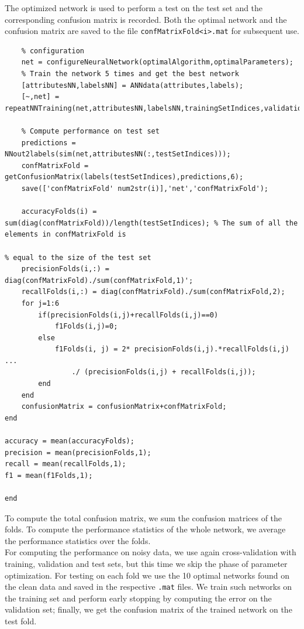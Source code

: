 \documentclass{article}
\begin{document}
The optimized network is used to perform a test on the test set and the corresponding confusion matrix is recorded. Both the optimal network and the confusion matrix are saved to the file \verb$confMatrixFold<i>.mat$ for subsequent use.
\begin{lstlisting}[firstnumber=57,breaklines=true]
    % Configure the best training algorithm with the optimal parameter
    % configuration
    net = configureNeuralNetwork(optimalAlgorithm,optimalParameters);
    % Train the network 5 times and get the best network
    [attributesNN,labelsNN] = ANNdata(attributes,labels);
    [~,net] = repeatNNTraining(net,attributesNN,labelsNN,trainingSetIndices,validationSetIndices);
    
    % Compute performance on test set
    predictions = NNout2labels(sim(net,attributesNN(:,testSetIndices)));
    confMatrixFold = getConfusionMatrix(labels(testSetIndices),predictions,6);
    save(['confMatrixFold' num2str(i)],'net','confMatrixFold');
    
    accuracyFolds(i) = sum(diag(confMatrixFold))/length(testSetIndices); % The sum of all the elements in confMatrixFold is
                                                                         % equal to the size of the test set
    precisionFolds(i,:) = diag(confMatrixFold)./sum(confMatrixFold,1)';
    recallFolds(i,:) = diag(confMatrixFold)./sum(confMatrixFold,2);
    for j=1:6
        if(precisionFolds(i,j)+recallFolds(i,j)==0)
            f1Folds(i,j)=0;
        else
            f1Folds(i, j) = 2* precisionFolds(i,j).*recallFolds(i,j) ...
                ./ (precisionFolds(i,j) + recallFolds(i,j));
        end
    end
    confusionMatrix = confusionMatrix+confMatrixFold;
end
    
accuracy = mean(accuracyFolds);
precision = mean(precisionFolds,1);
recall = mean(recallFolds,1);
f1 = mean(f1Folds,1); 
            
end
\end{lstlisting}

To compute the total confusion matrix, we sum the confusion matrices of the folds. To compute the performance statistics of the whole network, we average the performance statistics over the folds.\\
For computing the performance on noisy data, we use again cross-validation with training, validation and test sets, but this time we skip the phase of parameter optimization. For testing on each fold we use the 10 optimal networks found on the clean data and saved in the respective \verb$.mat$ files. We train such networks on the training set and perform early stopping by computing the error on the validation set; finally, we get the confusion matrix of the trained network on the test fold.
\end{document}

